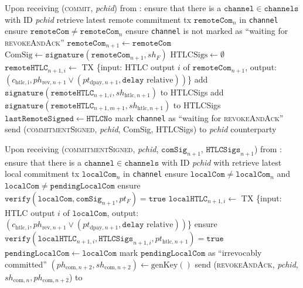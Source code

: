 \begin{algorithmic}[1]
    \State Upon receiving (\textsc{commit}, \textit{pchid}) from \environment:
    \Indent
      \State ensure that there is a $\mathtt{channel} \in \mathtt{channels}$
      with ID \textit{pchid}
      \State retrieve latest remote commitment tx $\mathtt{remoteCom}_n$ in
      \texttt{channel}
      \State ensure $\mathtt{remoteCom} \neq \mathtt{remoteCom}_n$
      \State ensure \texttt{channel} is not marked as ``waiting for
      \textsc{revokeAndAck}''
      \State $\mathtt{remoteCom}_{n+1} \gets \mathtt{remoteCom}$
      \State $\mathrm{ComSig} \gets
      \mathtt{signature}\left(\mathtt{remoteCom}_{n+1}, sh_F\right)$
      \State $\mathrm{HTLCSigs} \gets \emptyset$
        \State $\mathtt{remoteHTLC}_{n+1, i} \gets$ TX \{input: HTLC output $i$
        of $\mathtt{remoteCom}_{n+1}$, output: $\left(c_{\mathrm{htlc, i}},
        ph_{\mathrm{rev}, n+1} \vee \left(pt_{\mathrm{dpay}, n+1},
        \mathtt{delay} \text{ relative}\right)\right)$\}
        \State add $\mathtt{signature}\left(\mathtt{remoteHTLC}_{n+1, i},
        sh_{\mathrm{htlc}, n+1}\right)$ to HTLCSigs
      \EndFor
      \State add $\mathtt{signature}\left(\mathtt{remoteHTLC}_{n+1, m+1},
      sh_{\mathrm{htlc}, n+1}\right)$ to HTLCSigs
      \State $\mathtt{lastRemoteSigned} \gets \mathtt{HTLCNo}$
      \State mark \texttt{channel} as ``waiting for \textsc{revokeAndAck}''
      \State send (\textsc{commitmentSigned}, \textit{pchid}, ComSig, HTLCSigs)
      to \textit{pchid} counterparty
    \EndIndent
    \State

    \State Upon receiving (\textsc{commitmentSigned}, \textit{pchid},
    $\mathtt{comSig}_{n+1}$, $\mathtt{HTLCSigs}_{n+1}$) from \bob:
    \Indent
      \State ensure that there is a $\mathtt{channel} \in \mathtt{channels}$
      with ID \textit{pchid} with \bob
      \State retrieve latest local commitment tx $\mathtt{localCom}_n$ in
      \texttt{channel}
      \State ensure $\mathtt{localCom} \neq \mathtt{localCom}_n$ and
      $\mathtt{localCom} \neq \mathtt{pendingLocalCom}$
      \State ensure $\mathtt{verify}\left(\mathtt{localCom},
      \mathtt{comSig}_{n+1}, pt_F\right) = \mathtt{true}$
        \State $\mathtt{localHTLC}_{n+1, i} \gets$ TX \{input: HTLC output $i$
        of $\mathtt{localCom}$, output: $\left(c_{\mathrm{htlc, i}},
        ph_{\mathrm{rev}, n+1} \vee \left(pt_{\mathrm{dpay}, n+1},
        \mathtt{delay} \text{ relative}\right)\right)$\}
        \State ensure $\mathtt{verify}\left(\mathtt{localHTLC}_{n+1, i},
        \mathtt{HTLCSigs}_{n+1, i}, pt_{\mathrm{htlc}, n+1}\right) =
        \mathtt{true}$
      \EndFor
      \State $\mathtt{pendingLocalCom} \gets \mathtt{localCom}$
      \State mark $\mathtt{pendingLocalCom}$ as ``irrevocably committed''
      \State $\left(ph_{\mathrm{com}, n+2}, sh_{\mathrm{com}, n+2}\right) \gets
      \mathrm{genKey}\left(\right)$
      \State send (\textsc{revokeAndAck}, \textit{pchid}, $sh_{\mathrm{com}, n},
      ph_{\mathrm{com}, n+2}$) to \bob
    \EndIndent
    \State


\end{algorithmic}
